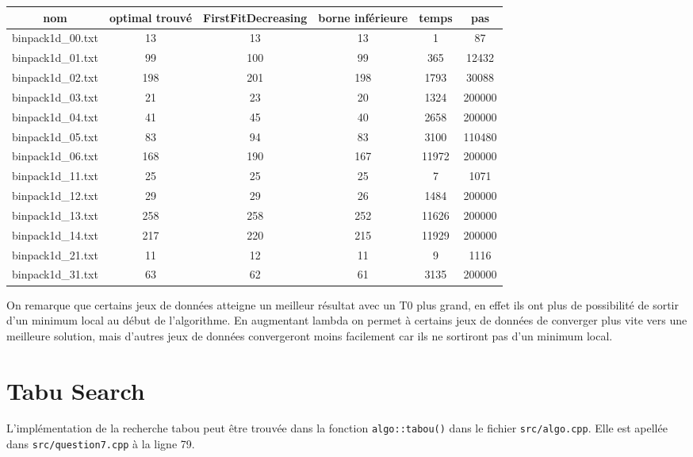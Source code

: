\documentclass[10pt,a4paper]{article}
\begin{document}
\begin{center}
  \begin{tabular}{ | c | c | c | c | c | c | }  \hline
    nom               & optimal trouvé   & FirstFitDecreasing & borne inférieure & temps & pas \\ \hline
    binpack1d\_00.txt & 13 & 13 & 13 & 1 & 87 \\ \hline
    binpack1d\_01.txt & 99 & 100 & 99 & 365 & 12432 \\ \hline
    binpack1d\_02.txt & 198 & 201 & 198 & 1793 & 30088 \\ \hline
    binpack1d\_03.txt & 21 & 23 & 20 & 1324 & 200000 \\ \hline
    binpack1d\_04.txt & 41 & 45 & 40 & 2658 & 200000 \\ \hline
    binpack1d\_05.txt & 83 & 94 & 83 & 3100 & 110480 \\ \hline
    binpack1d\_06.txt & 168 & 190 & 167 & 11972 & 200000 \\ \hline
    binpack1d\_11.txt & 25 & 25 & 25 & 7 & 1071 \\ \hline
    binpack1d\_12.txt & 29 & 29 & 26 & 1484 & 200000 \\ \hline
    binpack1d\_13.txt & 258 & 258 & 252 & 11626 & 200000 \\ \hline
    binpack1d\_14.txt & 217 & 220 & 215 & 11929 & 200000 \\ \hline
    binpack1d\_21.txt & 11 & 12 & 11 & 9 & 1116 \\ \hline
    binpack1d\_31.txt & 63 & 62 & 61 & 3135 & 200000 \\ \hline
  \end{tabular}
\end{center}

On remarque que certains jeux de données atteigne un meilleur résultat avec un T0 plus grand, en effet ils ont plus de possibilité de sortir d'un minimum local au début de l'algorithme.
En augmentant lambda on permet à certains jeux de données de converger plus vite vers une meilleure solution, mais d'autres jeux de données convergeront moins facilement car ils ne sortiront pas d'un minimum local.

\section{Tabu Search}

L'implémentation de la recherche tabou peut être trouvée dans la fonction \texttt{algo::tabou()} dans le fichier \texttt{src/algo.cpp}.
Elle est apellée dans \texttt{src/question7.cpp} à la ligne 79.
\end{document}
